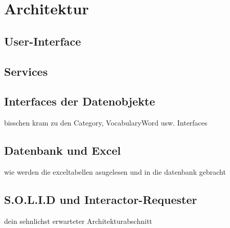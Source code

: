 
\section{Architektur}

\subsection{User-Interface}

\subsection{Services}

\subsection{Interfaces der Datenobjekte}
bisschen kram zu den Category, VocabularyWord usw. Interfaces

\subsection{Datenbank und Excel}
wie werden die exceltabellen asugelesen und in die datenbank gebracht

\subsection{S.O.L.I.D und Interactor-Requester}
dein sehnlichst erwarteter Architekturabschnitt